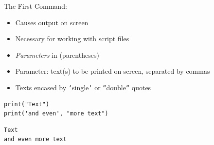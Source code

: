 
\begin{frame}[fragile]{The First Command: }
%
\begin{itemize}
\item Causes output on screen
\item Necessary for working with script files
\item \emph{Parameters} in (parentheses)
\item Parameter: text(s) to be printed on screen, separated by commas
\item Texts encased by \texttt{'}single\texttt{'} or \texttt{''}double\texttt{''} quotes
\end{itemize}

\vspace{10pt}
\begin{minipage}{.49\linewidth}
\begin{codebox}[Code]
\begin{verbatim}
print("Text")
print('and even', "more text")
\end{verbatim}
\end{codebox}
%
\end{minipage}
\begin{minipage}{.49\linewidth}
\begin{cmdbox}[Ausgabe]
\begin{verbatim}
Text
and even more text
\end{verbatim}
\end{cmdbox}
\end{minipage}
\end{frame}



